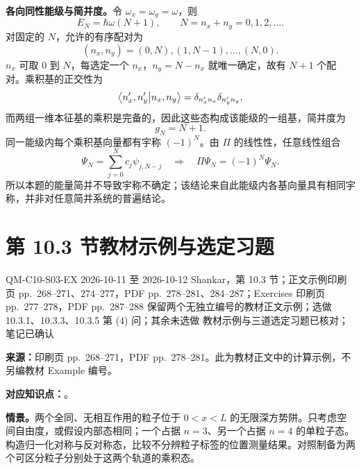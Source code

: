 \begin{checkedsolution}
\textbf{各向同性能级与简并度。}令 $\omega_x=\omega_y=\omega$，则
\begin{equation}
  \boxed{E_N=\hbar\omega(N+1)},\qquad
  N=n_x+n_y=0,1,2,\ldots.
\end{equation}
对固定的 $N$，允许的有序配对为
\begin{equation}
  (n_x,n_y)=(0,N),(1,N-1),\ldots,(N,0).
\end{equation}
$n_x$ 可取 $0$ 到 $N$，每选定一个 $n_x$，$n_y=N-n_x$ 就唯一确定，故有 $N+1$ 个配对。乘积基的正交性为
\begin{equation}
  \left\langle n_x',n_y' \middle| n_x,n_y \right\rangle
    =\delta_{n_x'n_x}\delta_{n_y'n_y},
\end{equation}
而两组一维本征基的乘积是完备的，因此这些态构成该能级的一组基，简并度为
\begin{equation}
  \boxed{g_N=N+1}.
\end{equation}
同一能级内每个乘积基向量都有宇称 $(-1)^N$。由 $\Pi$ 的线性性，任意线性组合
\begin{equation}
  \Psi_N=\sum_{j=0}^{N}c_j\psi_{j,N-j}
  \quad\Longrightarrow\quad
  \Pi\Psi_N=(-1)^N\Psi_N.
\end{equation}
所以本题的能量简并不导致宇称不确定；该结论来自此能级内各基向量具有相同宇称，并非对任意简并系统的普遍结论。
\end{checkedsolution}

\section{第 10.3 节教材示例与选定习题}
\label{exercise-set:QM-C10-S03}
\exercisemeta
  {QM-C10-S03-EX}
  {2026-10-11 至 2026-10-12}
  {Shankar，第 10.3 节；正文示例印刷页 pp.~268--271、274--277，PDF pp.~278--281、284--287；Exercises 印刷页 pp.~277--278，PDF pp.~287--288}
  {保留两个无独立编号的教材正文示例；选做 10.3.1、10.3.3、10.3.5 第 (4) 问；其余未选做}
  {教材示例与三道选定习题已核对；笔记已确认}

\textbf{来源：}印刷页 pp.~268--271，PDF pp.~278--281。此为教材正文中的计算示例，不另编教材 Example 编号。

\textbf{对应知识点：}。

\textbf{情景。}两个全同、无相互作用的粒子位于 $0<x<L$ 的无限深方势阱。只考虑空间自由度，或假设内部态相同；一个占据 $n=3$、另一个占据 $n=4$ 的单粒子态。构造归一化对称与反对称态，比较不分辨粒子标签的位置测量结果。对照制备为两个可区分粒子分别处于这两个轨道的乘积态。

